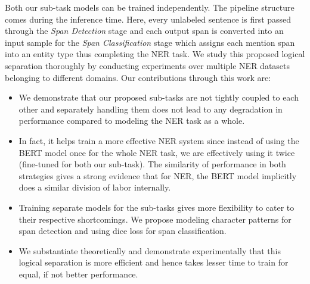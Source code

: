 Both our sub-task models can be trained independently. The pipeline structure comes during the inference time. Here, every unlabeled sentence is first passed through the \textit{Span Detection} stage and each output span is converted into an input sample for the \textit{Span Classification} stage which assigns each mention span into an entity type thus completing the NER task. We study this proposed logical separation thoroughly by conducting experiments over multiple NER datasets belonging to different domains. Our contributions through this work are:

\begin{itemize}
    \item We demonstrate that our proposed sub-tasks are not tightly coupled to each other and separately handling them does not lead to any degradation in performance compared to modeling the NER task as a whole. 
    
    \item In fact, it helps train a more effective NER system since instead of using the BERT model once for the whole NER task, we are effectively using it twice (fine-tuned for both our sub-task). The similarity of performance in both strategies gives a strong evidence that for NER, the BERT model implicitly does a similar division of labor internally.
    
    \item Training separate models for the sub-tasks gives more flexibility to cater to their respective shortcomings. We propose modeling character patterns for span detection and using dice loss for span classification.
    
    \item We substantiate theoretically and demonstrate experimentally that this logical separation is more efficient and hence takes lesser time to train for equal, if not better performance.
\end{itemize}
